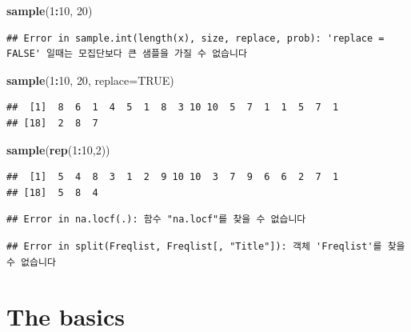 \documentclass[10pt,]{krantz}
\makeatletter
\newenvironment{Shaded}{\begin{snugshade}}{\end{snugshade}}
\newcommand{\KeywordTok}[1]{\textcolor[rgb]{0.13,0.29,0.53}{\textbf{#1}}}
\newcommand{\DataTypeTok}[1]{\textcolor[rgb]{0.13,0.29,0.53}{#1}}
\newcommand{\DecValTok}[1]{\textcolor[rgb]{0.00,0.00,0.81}{#1}}
\newcommand{\OtherTok}[1]{\textcolor[rgb]{0.56,0.35,0.01}{#1}}
\newcommand{\OperatorTok}[1]{\textcolor[rgb]{0.81,0.36,0.00}{\textbf{#1}}}
\newcommand{\NormalTok}[1]{#1}
\newenvironment{kframe}{%
\medskip{}
\setlength{\fboxsep}{.8em}
 \def\at@end@of@kframe{}%
 \ifinner\ifhmode%
  \def\at@end@of@kframe{\end{minipage}}%
  \begin{minipage}{\columnwidth}%
 \fi\fi%
 \def\FrameCommand##1{\hskip\@totalleftmargin \hskip-\fboxsep
 \colorbox{shadecolor}{##1}\hskip-\fboxsep
     \hskip-\linewidth \hskip-\@totalleftmargin \hskip\columnwidth}%
 \MakeFramed {\advance\hsize-\width
   \@totalleftmargin\z@ \linewidth\hsize
   \@setminipage}}%
 {\par\unskip\endMakeFramed%
 \at@end@of@kframe}
\renewenvironment{Shaded}{\begin{kframe}}{\end{kframe}}
\makeatother
\begin{document}
\begin{Shaded}
\begin{Highlighting}[]
\KeywordTok{sample}\NormalTok{(}\DecValTok{1}\OperatorTok{:}\DecValTok{10}\NormalTok{, }\DecValTok{20}\NormalTok{)}
\end{Highlighting}
\end{Shaded}

\begin{verbatim}
## Error in sample.int(length(x), size, replace, prob): 'replace = FALSE' 일때는 모집단보다 큰 샘플을 가질 수 없습니다
\end{verbatim}

\begin{Shaded}
\begin{Highlighting}[]
\KeywordTok{sample}\NormalTok{(}\DecValTok{1}\OperatorTok{:}\DecValTok{10}\NormalTok{, }\DecValTok{20}\NormalTok{, }\DataTypeTok{replace=}\OtherTok{TRUE}\NormalTok{)}
\end{Highlighting}
\end{Shaded}

\begin{verbatim}
##  [1]  8  6  1  4  5  1  8  3 10 10  5  7  1  1  5  7  1
## [18]  2  8  7
\end{verbatim}

\begin{Shaded}
\begin{Highlighting}[]
\KeywordTok{sample}\NormalTok{(}\KeywordTok{rep}\NormalTok{(}\DecValTok{1}\OperatorTok{:}\DecValTok{10}\NormalTok{,}\DecValTok{2}\NormalTok{))}
\end{Highlighting}
\end{Shaded}

\begin{verbatim}
##  [1]  5  4  8  3  1  2  9 10 10  3  7  9  6  6  2  7  1
## [18]  5  8  4
\end{verbatim}

\begin{verbatim}
## Error in na.locf(.): 함수 "na.locf"를 찾을 수 없습니다
\end{verbatim}

\begin{verbatim}
## Error in split(Freqlist, Freqlist[, "Title"]): 객체 'Freqlist'를 찾을 수 없습니다
\end{verbatim}

\section{The basics}\label{the-basics}
\end{document}
